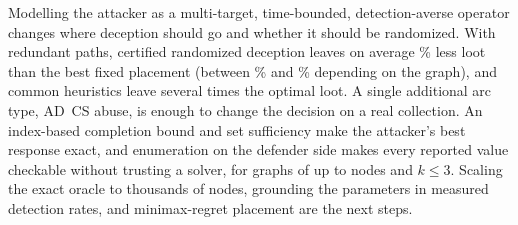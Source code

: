 \documentclass[runningheads]{llncs}
\begin{document}
Modelling the attacker as a multi-target, time-bounded, detection-averse operator changes where deception should go and whether it should be randomized. With redundant paths, certified randomized deception leaves on average \RedPct\% less loot than the best fixed placement (between \RedMin\% and \RedMax\% depending on the graph), and common heuristics leave several times the optimal loot. A single additional arc type, AD~CS abuse, is enough to change the decision on a real collection. An index-based completion bound and set sufficiency make the attacker's best response exact, and enumeration on the defender side makes every reported value checkable without trusting a solver, for graphs of up to \NodesMaxCert{} nodes and $k\le3$. Scaling the exact oracle to thousands of nodes, grounding the parameters in measured detection rates, and minimax-regret placement are the next steps.



\end{document}
